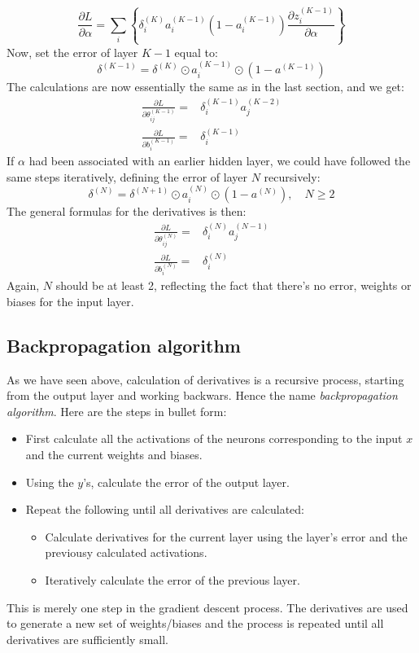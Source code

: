 \documentclass[12pt, a4paper]{article}
\numberwithin{equation}{section}
\begin{document}
\begin{equation}
\frac{\partial L}{\partial\alpha}=\sum_i\left\{\delta^{(K)}_i a_i^{(K-1)}\left(1-a_i^{(K-1)}\right)\frac{\partial z^{(K-1)}_i}{\partial\alpha}\right\}
\end{equation}
Now, set the error of layer $K-1$ equal to:
\begin{equation}
\delta^{(K-1)}=\delta^{(K)}\odot a_i^{(K-1)}\odot\left(1-a^{(K-1)}\right)
\end{equation}
The calculations are now essentially the same as in the last section, and we get:
\begin{align}
\frac{\partial L}{\partial\theta^{(K-1)}_{ij}}=&\delta^{(K-1)}_i a^{(K-2)}_j\\
\frac{\partial L}{\partial b^{(K-1)}_i}=&\delta^{(K-1)}_i
\end{align}
If $\alpha$ had been associated with an earlier hidden layer, we could have followed the same steps iteratively, defining the error of layer $N$ recursively:
\begin{equation}
\delta^{(N)}=\delta^{(N+1)}\odot a_i^{(N)}\odot\left(1-a^{(N)}\right),\quad N\ge 2
\end{equation}
The general formulas for the derivatives is then:
\begin{align}
\frac{\partial L}{\partial\theta^{(N)}_{ij}}=&\delta^{(N)}_i a^{(N-1)}_j\\
\frac{\partial L}{\partial b^{(N)}_i}=&\delta^{(N)}_i
\end{align}
Again, $N$ should be at least 2, reflecting the fact that there's no error, weights or biases for the input layer.

\subsection{Backpropagation algorithm}
As we have seen above, calculation of derivatives is a recursive process, starting from the output layer and working backwars. Hence the name \textit{backpropagation algorithm}. Here are the steps in bullet form:
\begin{itemize}
\item First calculate all the activations of the neurons corresponding to the input $x$ and the current weights and biases.
\item Using the $y$'s, calculate the error of the output layer.
\item Repeat the following until all derivatives are calculated:
\begin{itemize}
\item Calculate derivatives for the current layer using the layer's error and the previousy calculated activations.
\item Iteratively calculate the error of the previous layer.
\end{itemize}
\end{itemize}
This is merely one step in the gradient descent process. The derivatives are used to generate a new set of weights/biases and the process is repeated until all derivatives are sufficiently small.
\end{document}
